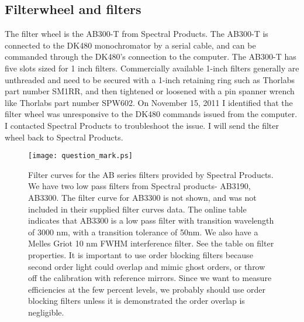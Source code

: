\subsection{Filterwheel and filters}
The filter wheel is the AB300-T from Spectral Products.  The AB300-T is connected to the DK480 monochromator by a serial cable, and can be commanded through the DK480's connection to the computer.  The AB300-T has five slots sized for 1 inch filters.  Commercially available 1-inch filters generally are unthreaded and need to be secured with a 1-inch retaining ring such as Thorlabs part number SM1RR, and then tightened or loosened with a pin spanner wrench like Thorlabs part number SPW602.  On November 15, 2011 I identified that the filter wheel was unresponsive to the DK480 commands issued from the computer.  I  contacted Spectral Products to troubleshoot the issue.  I will send the filter wheel back to Spectral Products.



\begin{figure}
    \texttt{[image: question\_mark.ps]}
  \caption[Spectral products filter curves]{Filter curves for the AB series filters provided by Spectral Products.  We have two low pass filters from Spectral products- AB3190, AB3300. The filter curve for AB3300 is not shown, and was not included in their supplied filter curves data.  The online table indicates that AB3300 is a low pass filter with transition wavelength of 3000 nm, with a transition tolerance of 50nm.  We also have a Melles Griot 10 nm FWHM interference filter.  See the table on filter properties.  It is important to use order blocking filters because second order light could overlap and mimic ghost orders, or throw off the calibration with reference mirrors.  Since we want to measure efficiencies at the few percent levels, we probably should use order blocking filters unless it is demonstrated the order overlap is negligible.}
\end{figure}

